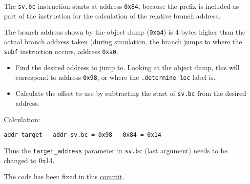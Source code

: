 The \texttt{sv.bc} instruction starts at address \texttt{0x84}, because
the prefix is included as part of the instruction for the calculation of the
relative branch address.

The branch address shown by the object dump (\texttt{0xa4}) is 4 bytes higher
than the actual branch address taken (during simulation, the branch jumps to
where the \texttt{subf} instruction occurs, address \texttt{0xa0}.


\begin{itemize}
  \item Find the desired address to jump to. Looking at the object dump,
  this will correspond to address \texttt{0x98}, or where the
\texttt{.determine\_loc} label is.
  \item Calculate the offset to use by subtracting the start of \texttt{sv.bc}
  from the desired address.
\end{itemize}

Calculation:

\begin{verbatim}
addr_target - addr_sv.bc = 0x98 - 0x84 = 0x14
\end{verbatim}

Thus the \texttt{target\_address} parameter in \texttt{sv.bc}
(last argument) needs to be changed to {0x14}.

The code has been fixed in this
\href{https://git.vantosh.com/ngisearch/glibc-svp64/commit/2d2c0f70dc5cca10a1c5d92d726406903f9e5b23}{commit}.